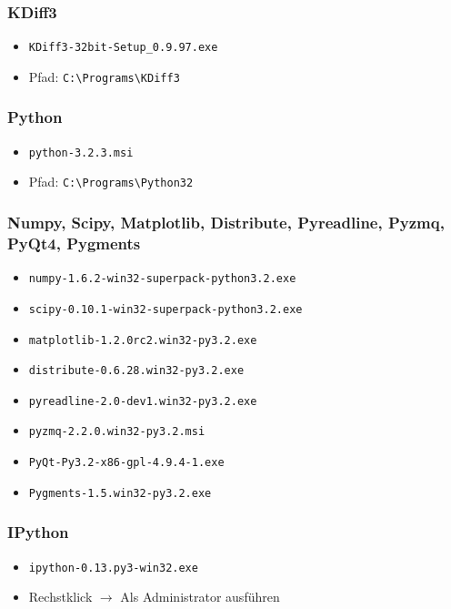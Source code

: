 \subsubsection{KDiff3}
\begin{itemize}
  \item \texttt{KDiff3-32bit-Setup\_0.9.97.exe}
  \item Pfad: \verb|C:\Programs\KDiff3|
\end{itemize}

\subsubsection{Python}
\begin{itemize}
  \item \texttt{python-3.2.3.msi}
  \item Pfad: \verb|C:\Programs\Python32|
\end{itemize}

\subsubsection{Numpy, Scipy, Matplotlib, Distribute, Pyreadline, Pyzmq, PyQt4, Pygments}
\begin{itemize}
  \item \texttt{numpy-1.6.2-win32-superpack-python3.2.exe}
  \item \texttt{scipy-0.10.1-win32-superpack-python3.2.exe}
  \item \texttt{matplotlib-1.2.0rc2.win32-py3.2.exe}
  \item \texttt{distribute-0.6.28.win32-py3.2.exe}
  \item \texttt{pyreadline-2.0-dev1.win32-py3.2.exe}
  \item \texttt{pyzmq-2.2.0.win32-py3.2.msi}
  \item \texttt{PyQt-Py3.2-x86-gpl-4.9.4-1.exe}
  \item \texttt{Pygments-1.5.win32-py3.2.exe}
\end{itemize}

\subsubsection{IPython}
\begin{itemize}
  \item \texttt{ipython-0.13.py3-win32.exe}
  \item Rechstklick $\rightarrow$ Als Administrator ausführen
\end{itemize}

